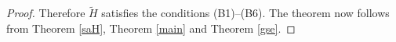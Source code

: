 \documentclass[12pt]{article}
\theoremstyle{plain}
\newtheorem{theorem}{Theorem}[section]
\numberwithin{equation}{section}
\theoremstyle{remark}
\begin{document}
\begin{proof}
Therefore $\tilde{H}$ satisfies the conditions (B1)--(B6).
The theorem now follows from Theorem \ref{saH}, Theorem \ref{main} and Theorem \ref{gse}.
\end{proof}



\begin{comment}
\subsection{A Model of  a Harmonic Oscillator Coupled to a Bose Field with the Spring Constant Renormalization}

We continue to study the Hamiltonian $H$ defined in Subsection \ref{ho+bose}.
We consider a perturbation of $H$ by adding a term $R$, which corresponds to the spring constant renormalization:
\[
H':=H+R,\ \ \ \ \ R:=\frac{\lambda^2\|T^{-1/2}g\|^2}{2}x^2\otimes1.
\]
The Hamiltonian $H'$ was investigated in \cite{Ar81}.
This perturbation allows us to diagonalize $H'$ for an arbitrary coupling constant $\lambda\in\RR$.

\begin{theorem}
The Hamiltonian $H'$ is essentially self-adjoint, and there are unitary operator 
$U:L^2(\RR,dx)\otimes\Fb(\sH)\to\Fb(\CC\oplus\sH)$ and a real constant $E\in\RR$ such that 
\[
UH'U^*={\rm d}\Gamma_{\rm b}\left(\sqrt{\gamma(\beta+\lambda^2\|T^{-1/2}g\|^2)\oplus T^2+W}\right) + E,
\]
where $W$ is a finite rank operator on $\CC\oplus\sH$ defined by
\[
W:=
\begin{pmatrix}
0 & \gamma^{1/2}\lambda|1\rangle\langle T^{1/2}g| \\
\gamma^{1/2}\lambda |T^{1/2}g\rangle\langle 1| & 0
\end{pmatrix}.
\]
\end{theorem}

\begin{proof}
Since
\[
H'=\left\{\frac{\gamma}{2}p^2+\frac{\beta+\lambda^2\|T^{-1/2}g\|^2}{2}x^2\right\}\otimes1 +1\otimes \dGb(T) + \lambda x\otimes\Phi_{\rm S}(g),
\]
the theorem follows from Theorem \ref{ho+boson diag}.
\end{proof}
\end{comment}
\end{document}
